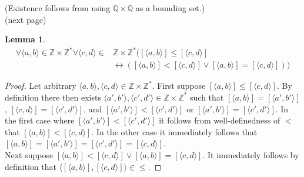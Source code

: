 \documentclass{report}
\newtheorem{lemma}[theo]{Lemma}
\begin{document}
\noindent(Existence follows from using $\mathbb Q\times\mathbb Q$ as a bounding set.)\\
(next page)\newpage
\begin{lemma}\label{Q_nonstrict_order_lemma_1}
\begin{align*}
\forall\langle a,b\rangle\in\mathbb Z\times\mathbb Z^*\forall\langle c,d\rangle\in&\mathbb Z\times\mathbb Z^*([\langle a,b\rangle]\leq[\langle c,d\rangle]\\
&\leftrightarrow([\langle a,b\rangle]<[\langle c,d\rangle]\lor[\langle a,b\rangle]=[\langle c,d\rangle]))
\end{align*}
\end{lemma}
\begin{proof}
Let arbitrary $\langle a,b\rangle,\langle c,d\rangle\in\mathbb Z\times\mathbb Z^*$. First suppose $[\langle a,b\rangle]\leq[\langle c,d\rangle]$.
By definition there then exists $\langle a',b'\rangle,\langle c',d'\rangle\in\mathbb Z\times\mathbb Z^*$ such that $[\langle a,b\rangle]=[\langle a',b'\rangle]$, 
$[\langle c,d\rangle]=[\langle c',d'\rangle]$, and $[\langle a',b'\rangle]<[\langle c',d'\rangle]$ or $[\langle a',b'\rangle]=[\langle c',d'\rangle]$. In the first case where
$[\langle a',b'\rangle]<[\langle c',d'\rangle]$ it follows from well-definedness of $<$ that 
$[\langle a,b\rangle]<[\langle c,d\rangle]$. In the other case it immediately follows that
$[\langle a,b\rangle]=[\langle a',b'\rangle]=[\langle c',d'\rangle]=[\langle c,d\rangle]$.\\
\indent Next suppose $[\langle a,b\rangle]<[\langle c,d\rangle]\lor[\langle a,b\rangle]=[\langle c,d\rangle]$. It immediately follows by definition that $\langle[\langle a,b\rangle],[\langle c,d\rangle]\rangle\in\leq$.
\end{proof}
\end{document}
